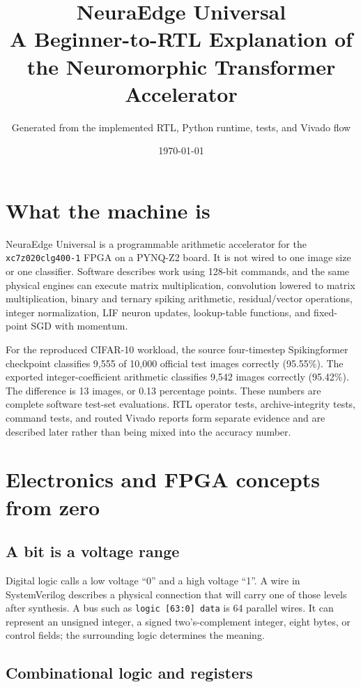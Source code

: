 \documentclass[10pt]{article}
\title{NeuraEdge Universal\\A Beginner-to-RTL Explanation of the Neuromorphic Transformer Accelerator}
\author{Generated from the implemented RTL, Python runtime, tests, and Vivado flow}
\date{\today}
\begin{document}
\maketitle
\tableofcontents
\clearpage

\section{What the machine is}

NeuraEdge Universal is a programmable arithmetic accelerator for the
\texttt{xc7z020clg400-1} FPGA on a PYNQ-Z2 board. It is not wired to one image
size or one classifier. Software describes work using 128-bit commands, and the
same physical engines can execute matrix multiplication, convolution lowered to
matrix multiplication, binary and ternary spiking arithmetic, residual/vector
operations, integer normalization, LIF neuron updates, lookup-table functions,
and fixed-point SGD with momentum.

For the reproduced CIFAR-10 workload, the source four-timestep Spikingformer
checkpoint classifies 9,555 of 10,000 official test images correctly
(95.55\%). The exported integer-coefficient arithmetic classifies 9,542 images
correctly (95.42\%). The difference is 13 images, or 0.13 percentage points.
These numbers are complete software test-set evaluations. RTL operator tests,
archive-integrity tests, command tests, and routed Vivado reports form separate
evidence and are described later rather than being mixed into the accuracy
number.

\section{Electronics and FPGA concepts from zero}

\subsection{A bit is a voltage range}

Digital logic calls a low voltage ``0'' and a high voltage ``1''. A wire in
SystemVerilog describes a physical connection that will carry one of those
levels after synthesis. A bus such as \texttt{logic [63:0] data} is 64 parallel
wires. It can represent an unsigned integer, a signed two's-complement integer,
eight bytes, or control fields; the surrounding logic determines the meaning.

\subsection{Combinational logic and registers}
\end{document}
